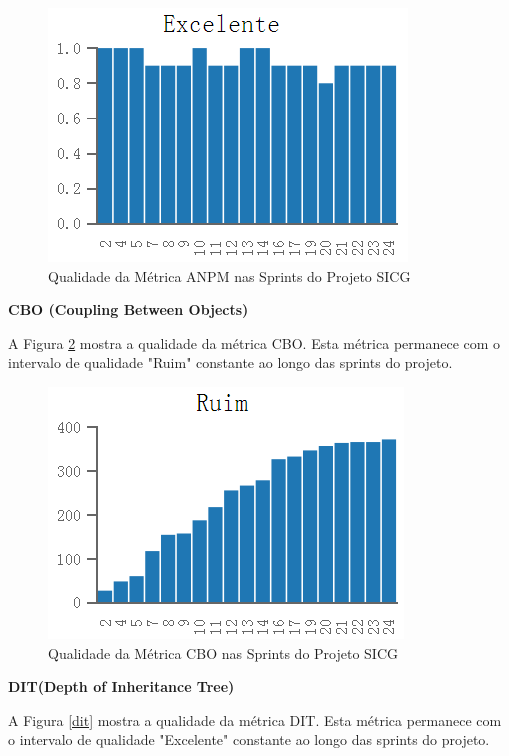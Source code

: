 \begin{figure}[H]
		\centering
			\includegraphics[scale=1.0]{figuras/anpm.png}
		\caption{Qualidade da Métrica ANPM nas Sprints do Projeto SICG}
		\label{anpm}
\end{figure}

\textbf{CBO (Coupling Between Objects)}

A Figura \ref{cbo} mostra a qualidade da métrica CBO. Esta métrica permanece com o intervalo de qualidade "Ruim" constante ao longo das sprints do projeto.

\begin{figure}[H]
		\centering
			\includegraphics[scale=1.0]{figuras/cbo.png}
		\caption{Qualidade da Métrica CBO nas Sprints do Projeto SICG}
		\label{cbo}
\end{figure}

\textbf{DIT(Depth of Inheritance Tree)}

A Figura \ref{dit} mostra a qualidade da métrica DIT. Esta métrica permanece com o intervalo de qualidade "Excelente" constante ao longo das sprints do projeto.

